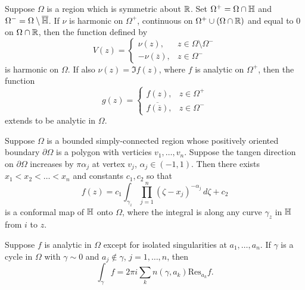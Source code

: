 \documentclass[12pt]{article}
\begin{document}
\begin{sats}
    Suppose $\Omega$ is a region which is symmetric about $\mathbb{R}$. Set $\Omega^+=\Omega\cap\mathbb{H}$ and $\Omega^-=\Omega\setminus\overline{\mathbb{H}}$. If $\nu$ is harmonic on $\Omega^+$, continuous on $\Omega^+\cup(\Omega\cap\mathbb{R})$ and equal to $0$ on $\Omega\cap\mathbb{R}$, then the function defined by
    \begin{equation*}
        V(z)=\begin{cases}
            \nu(z),&z\in\Omega\setminus\Omega^-\\
            -\nu(\overline{z}),&z\in \Omega^-
        \end{cases}
    \end{equation*}
    is harmonic on $\Omega$. If also $\nu(z)=\Im f(z)$, where $f$ is analytic on $\Omega^+$, then the function
    \begin{equation*}
        g(z)=\begin{cases}
            f(z),&z\in\Omega^+\\
            \overline{f(\overline{z})},&z\in \Omega^-
        \end{cases}
    \end{equation*}
    extends to be analytic in $\Omega$.
\end{sats}

\begin{sats}
    Suppose $\Omega$ is a bounded simply-connected region whose positively oriented boundary $\partial\Omega$ is a polygon with verticies $v_1,\dots,v_n$. Suppose the tangen direction on $\partial\Omega$ increases by $\pi\alpha_j$ at vertex $v_j$, $\alpha_j\in(-1,1)$. Then there exists $x_1<x_2<\dots<x_n$ and constants $c_1,c_2$ so that
    \begin{equation*}
        f(z) = c_1\int_{\gamma_z} \prod_{j=1}^n (\zeta-x_j)^{-\alpha_j}\,d\zeta +c_2
    \end{equation*}
    is a conformal map of $\mathbb{H}$ onto $\Omega$, where the integral is along any curve $\gamma_z$ in $\mathbb{H}$ from $i$ to $z$.
\end{sats}

\begin{sats}
    Suppose $f$ is analytic in $\Omega$ except for isolated singularities at $a_1,\dots,a_n$. If $\gamma$ is a cycle in $\Omega$ with $\gamma\sim 0$ and $a_j\notin\gamma$, $j=1,\dots,n$, then
    \begin{equation*}
        \int_\gamma f=2\pi i\sum_{k} n(\gamma,a_k)\text{Res}_{a_k} f.
    \end{equation*}
\end{sats}
\end{document}

